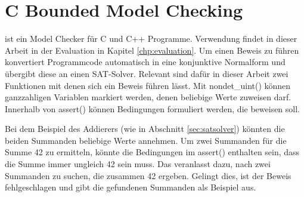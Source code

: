 \section{C Bounded Model Checking}
\label{sec:cbmc}

 ist ein Model Checker für C und C++ Programme. Verwendung findet  in dieser Arbeit in der Evaluation in Kapitel \ref{chp:evaluation}.
Um einen Beweis zu führen konvertiert  Programmcode automatisch in eine konjunktive Normalform und übergibt diese an einen SAT-Solver.
Relevant sind dafür in dieser Arbeit zwei Funktionen mit denen sich ein Beweis führen lässt. Mit nondet\_uint() können ganzzahligen Variablen markiert
werden, denen  beliebige Werte zuweisen darf. Innerhalb von assert() können Bedingungen formuliert werden, die  beweisen soll.

Bei dem Beispiel des Addierers (wie in Abschnitt \ref{sec:satsolver}) könnten die beiden Summanden beliebige Werte annehmen. Um zwei Summanden für die
Summe 42 zu ermitteln, könnte die Bedingungen im assert() enthalten sein, dass die Summe immer ungleich 42 sein muss. Das veranlasst  dazu, nach
zwei Summanden zu suchen, die zusammen 42 ergeben. Gelingt dies, ist der Beweis fehlgeschlagen und  gibt die gefundenen Summanden als Beispiel aus.